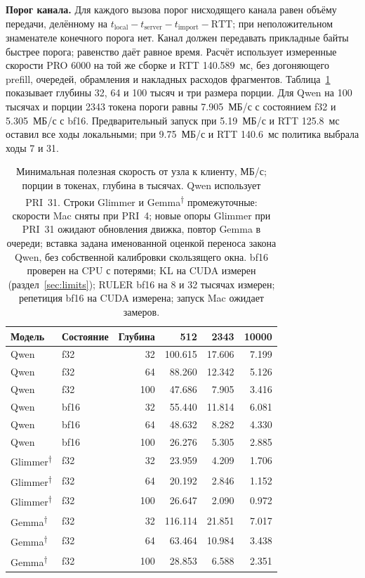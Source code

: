 \textbf{Порог канала.} Для каждого вызова порог нисходящего канала равен объёму передачи,
делённому на $t_{\mathrm{local}}-t_{\mathrm{server}}-t_{\mathrm{import}}-\mathrm{RTT}$;
при неположительном знаменателе конечного порога нет. Канал должен передавать прикладные байты
быстрее порога; равенство даёт равное время. Расчёт использует измеренные скорости PRO 6000
на той же сборке и RTT 140.589~мс, без догоняющего prefill, очередей, обрамления и накладных расходов фрагментов.
Таблица~\ref{tab:model-link} показывает глубины 32, 64 и 100 тысяч и три размера порции.
Для Qwen на 100 тысячах и порции 2343 токена пороги равны 7.905~МБ/с с состоянием f32 и 5.305~МБ/с с bf16.
Предварительный запуск при 5.19~МБ/с и RTT 125.8~мс оставил все ходы локальными;
при 9.75~МБ/с и RTT 140.6~мс политика выбрала ходы 7 и 31.

\begin{table}[t]
\centering
\caption{Минимальная полезная скорость от узла к клиенту, МБ/с; порции в токенах, глубина в тысячах.
Qwen использует PRI~31. Строки Glimmer и Gemma\textsuperscript{†} промежуточные:
скорости Mac сняты при PRI~4; новые опоры Glimmer при PRI~31 ожидают обновления движка, повтор Gemma в очереди; вставка задана именованной оценкой
переноса закона Qwen, без собственной калибровки скользящего окна. bf16 проверен на CPU с потерями;
KL на CUDA измерен (раздел~\ref{sec:limits}); RULER bf16 на 8 и 32 тысячах измерен; репетиция bf16 на CUDA измерена; запуск Mac ожидает замеров.}
\label{tab:model-link}
\footnotesize
\begin{tabular}{llrrrr}
\toprule
Модель & Состояние & Глубина & 512 & 2343 & 10000 \\
\midrule
Qwen & f32 & 32 & 100.615 & 17.606 & 7.199 \\
Qwen & f32 & 64 & 88.260 & 12.342 & 5.126 \\
Qwen & f32 & 100 & 47.686 & 7.905 & 3.416 \\
Qwen & bf16 & 32 & 55.440 & 11.814 & 6.081 \\
Qwen & bf16 & 64 & 48.632 & 8.282 & 4.330 \\
Qwen & bf16 & 100 & 26.276 & 5.305 & 2.885 \\
Glimmer\textsuperscript{†} & f32 & 32 & 23.959 & 4.209 & 1.706 \\
Glimmer\textsuperscript{†} & f32 & 64 & 20.192 & 2.846 & 1.152 \\
Glimmer\textsuperscript{†} & f32 & 100 & 26.647 & 2.090 & 0.972 \\
Gemma\textsuperscript{†} & f32 & 32 & 116.114 & 21.851 & 7.017 \\
Gemma\textsuperscript{†} & f32 & 64 & 63.464 & 10.984 & 3.438 \\
Gemma\textsuperscript{†} & f32 & 100 & 28.853 & 6.588 & 2.351 \\
\bottomrule
\end{tabular}
\end{table}

